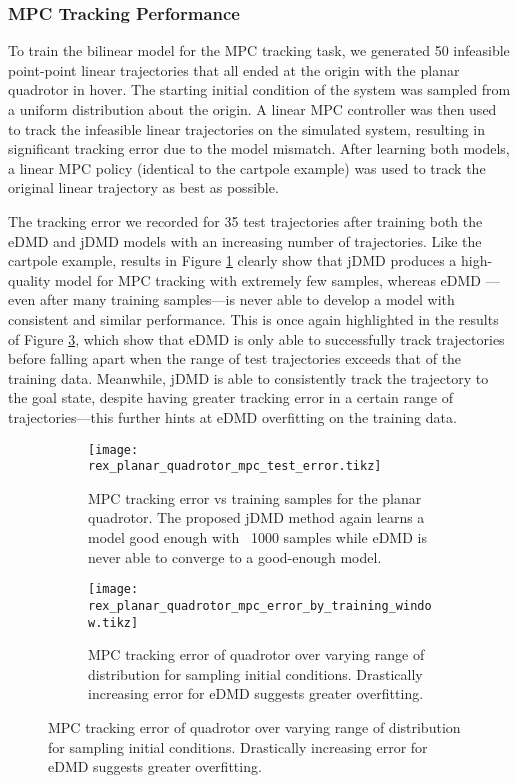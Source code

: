 \documentclass{article}
\begin{document}
\subsubsection{MPC Tracking Performance}

To train the bilinear model for the MPC tracking task, we generated 50 infeasible point-point
linear trajectories that all ended at the origin with the planar quadrotor in hover. The starting
initial condition of the system was sampled from a uniform distribution about the origin.
A linear MPC controller was then used to track the infeasible linear trajectories on the
simulated system, resulting in significant tracking error due to the model mismatch. 
After learning both models, a linear MPC policy (identical to the cartpole example) was
used to track the original linear trajectory as best as possible.

The tracking error we recorded for 35 test trajectories after training both the eDMD 
and jDMD models with an increasing number of trajectories. Like the cartpole example,
results in Figure \ref{fig:rex_planar_quadrotor_mpc_test_error} clearly show that jDMD
produces a high-quality model for MPC tracking with extremely few samples, whereas eDMD
---even after many training samples---is never able to develop a model with consistent
and similar performance. This is once again highlighted
in the results of Figure \ref{fig:rex_planar_quadrotor_mpc_error_by_training_window}, which
show that eDMD is only able to successfully track trajectories before falling apart when the
range of test trajectories exceeds that of the training data. Meanwhile, jDMD is able to consistently
track the trajectory to the goal state, despite having greater tracking error in a certain range
of trajectories---this further hints at eDMD overfitting on the training data.

\begin{figure}[t]
    \centering
    \begin{subfigure}[t]{0.48\textwidth}
        \raggedleft
        \texttt{[image: rex\_planar\_quadrotor\_mpc\_test\_error.tikz]}
        \caption{MPC tracking error vs training samples for the planar quadrotor. The proposed jDMD method again learns a model good enough with ~1000 samples while eDMD is never able to converge to a good-enough model.}
        \label{fig:rex_planar_quadrotor_mpc_test_error}
    \end{subfigure}
    \hfill
    \begin{subfigure}[t]{0.48\textwidth}
        \raggedright
        \texttt{[image: rex\_planar\_quadrotor\_mpc\_error\_by\_training\_window.tikz]}
        \caption{MPC tracking error of quadrotor over varying range of distribution for sampling initial conditions. Drastically increasing error for eDMD suggests greater overfitting.}
        \label{fig:rex_planar_quadrotor_mpc_error_by_training_window}
    \end{subfigure}
\end{figure}
\end{document}
